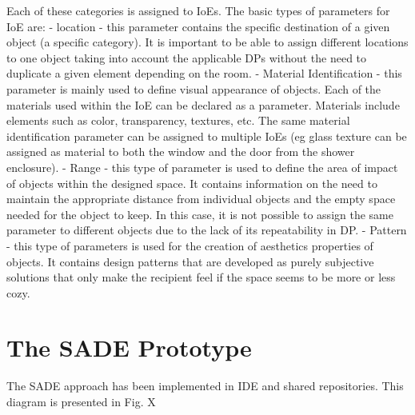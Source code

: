 \documentclass[runningheads]{llncs}
\begin{document}
Each of these categories is assigned to IoEs. The basic types of parameters for IoE are:
- location - this parameter contains the specific destination of a given object (a specific category). It is important to be able to assign different locations to one object taking into account the applicable DPs without the need to duplicate a given element depending on the room.
- Material Identification - this parameter is mainly used to define visual appearance of objects. Each of the materials used within the IoE can be declared as a parameter. Materials include elements such as color, transparency, textures, etc. The same material identification parameter can be assigned to multiple IoEs (eg glass texture can be assigned as material to both the window and the door from the shower enclosure).
- Range - this type of parameter is used to define the area of impact of objects within the designed space. It contains information on the need to maintain the appropriate distance from individual objects and the empty space needed for the object to keep. In this case, it is not possible to assign the same parameter to different objects due to the lack of its repeatability in DP.
- Pattern - this type of parameters is used for the creation of aesthetics properties of objects. It contains design patterns that are developed as purely subjective solutions that only make the recipient feel if the space seems to be more or less cozy. 


\section{The SADE Prototype}
The SADE approach has been implemented in IDE and shared repositories. This diagram is presented in Fig. X
\end{document}
